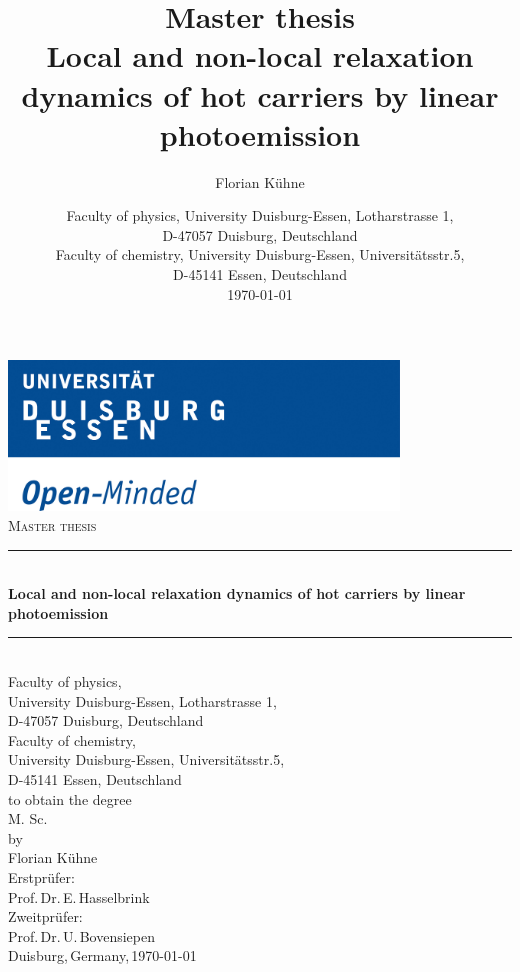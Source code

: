 \documentclass[a4paper,12pt,twoside]{article}
\author {Florian Kühne}
\date{
	Faculty of physics, University Duisburg-Essen, Lotharstrasse 1,\\ D-47057 Duisburg, Deutschland\\
		Faculty of chemistry, University Duisburg-Essen, Universitätsstr.5,\\ D-45141 Essen, Deutschland\\
	
	\today
}
\title { Master thesis \\
Local and non-local relaxation dynamics of hot carriers by linear photoemission}
\newcommand{\HRule}{\rule{\linewidth}{0.5mm}}
\begin{document}
\begin{center}
\thispagestyle{empty}
\includegraphics[height=4cm, width=\columnwidth]{logo_en.jpg}\\[1cm] %

\textsc{\LARGE Master thesis}\\[0.5cm] %

\HRule \\ [0.5cm]
{{\huge \bfseries Local and non-local relaxation dynamics of hot carriers by linear photoemission}} \\ [0.2cm] %
\HRule \\ [1cm]

	Faculty of physics,\\ University Duisburg-Essen, Lotharstrasse 1,\\ D-47057 Duisburg, Deutschland\\ [0.2cm]
Faculty of chemistry, 
\\University Duisburg-Essen, Universitätsstr.5,\\ D-45141 Essen, Deutschland\\ [0.2cm]
to obtain the degree\\ 
M. Sc.\\ 
by \\ [0.5cm]

{{Florian Kühne}}\\  [2cm]

Erstprüfer:\\
Prof.\,Dr.\,E.\,Hasselbrink\\
Zweitprüfer:\\
Prof.\,Dr.\,U.\,Bovensiepen\\[2.5cm]

Duisburg,\,Germany,\,\today\\

\end{center}

\newpage
\end{document}
